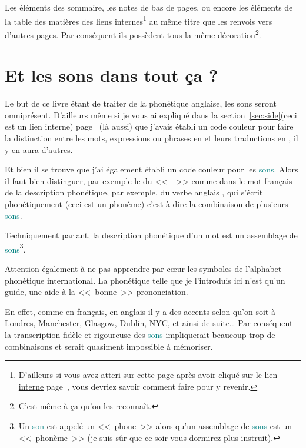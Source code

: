 Les éléments des sommaire, les notes de bas de pages, ou encore les
éléments de la table des matières des \hypertarget{linkin}{liens
  internes}\footnote{D'ailleurs si vous avez atteri sur cette page
  après avoir cliqué sur le \hyperlink{retour}{lien interne}
  page~\pageref{retour}, vous devriez savoir comment faire pour y
  revenir.} au même titre que les renvois vers d'autres pages. Par
conséquent ils possèdent tous la même décoration\footnote{C'est même à
ça qu'on les reconnaît.}.  

\newpage

\section{Et les sons dans tout ça ?}\label{sec:phonetics}

Le but de ce livre étant de traiter de la phonétique anglaise, les
sons seront omniprésent. D'ailleurs même si je vous ai expliqué dans
la section~\ref{sec:side}(ceci est un lien interne)
page~\pageref{sec:side} (là aussi) que j'avais établi un code
couleur pour faire la distinction entre les mots, expressions ou
phrases en  et leurs traductions en , il
y en aura d'autres.

Et bien il se trouve que j'ai également établi un code couleur pour
les \textcolor{teal}{sons}. Alors il faut bien distinguer, par exemple
le \son {} du <<~~>> comme dans le mot français  de la
description phonétique, par exemple, du verbe anglais , qui
s'écrit phonétiquement  (ceci est un phonème) c'est-à-dire
la combinaison de plusieurs \textcolor{teal}{sons}.

Techniquement parlant, la description phonétique d'un mot est un
assemblage de \textcolor{teal}{sons}\footnote{Un \textcolor{teal}{son}
  est appelé un <<~phone~>> alors qu'un assemblage de
  \textcolor{teal}{sons} est un <<~phonème~>> (je suis sûr que ce soir
  vous dormirez plus instruit).}.

Attention également à ne pas apprendre par c{\oe}ur les symboles de
l'alphabet phonétique international. La phonétique telle que je
l'introduis ici n'est qu'un guide, une aide à la <<~bonne~>>
prononciation.

En effet, comme en français, en anglais il y a des accents selon qu'on
soit à Londres, Manchester, Glasgow, Dublin, NYC, et ainsi de suite\dots\xspace Par conséquent
la transcription fidèle et rigoureuse des \textcolor{teal}{sons}
impliquerait beaucoup trop de combinaisons et serait quasiment
impossible à mémoriser.

